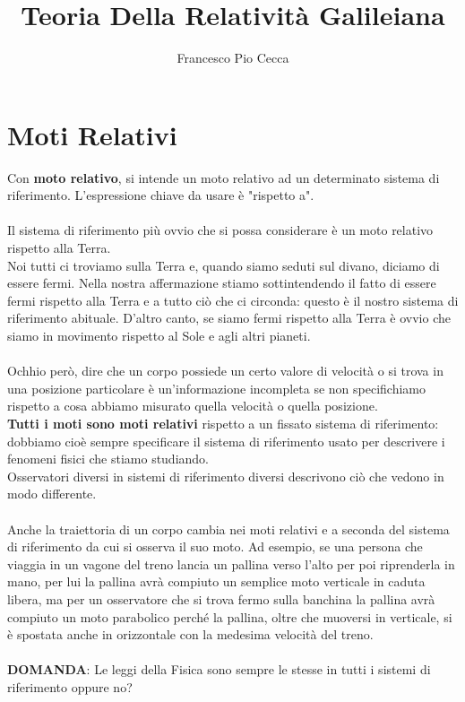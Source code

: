 \documentclass{article}
\title{Teoria Della Relatività Galileiana}
\author{Francesco Pio Cecca}
\begin{document}
\maketitle
\section{Moti Relativi}

Con \textbf{moto relativo}, si intende un moto relativo ad un determinato sistema di riferimento. L'espressione chiave da usare è "rispetto a".\\\\
Il sistema di riferimento più ovvio che si possa considerare è un moto relativo rispetto alla Terra.\\
Noi tutti ci troviamo sulla Terra e, quando siamo seduti sul divano, diciamo di essere fermi. Nella nostra affermazione stiamo sottintendendo il fatto di essere fermi rispetto alla Terra e a tutto ciò che ci circonda: questo è il nostro sistema di riferimento abituale. D'altro canto, se siamo fermi rispetto alla Terra è ovvio che siamo in movimento rispetto al Sole e agli altri pianeti.\\\\
Ochhio però, dire che un corpo possiede un certo valore di velocità o si trova in una posizione particolare è un'informazione incompleta se non specifichiamo rispetto a cosa abbiamo misurato quella velocità o quella posizione.\\
\textbf{Tutti i moti sono moti relativi} rispetto a un fissato sistema di riferimento: dobbiamo cioè sempre specificare il sistema di riferimento usato per descrivere i fenomeni fisici che stiamo studiando.\\
Osservatori diversi in sistemi di riferimento diversi descrivono ciò che vedono in modo differente.\\\\
Anche la traiettoria di un corpo cambia nei moti relativi e a seconda del sistema di riferimento da cui si osserva il suo moto. Ad esempio, se una persona che viaggia in un vagone del treno lancia un pallina verso l'alto per poi riprenderla in mano, per lui la pallina avrà compiuto un semplice moto verticale in caduta libera, ma per un osservatore che si trova fermo sulla banchina la pallina avrà compiuto un moto parabolico perché la pallina, oltre che muoversi in verticale, si è spostata anche in orizzontale con la medesima velocità del treno.\\\\
\textbf{DOMANDA}: Le leggi della Fisica sono sempre le stesse in tutti i sistemi di riferimento oppure no?
\end{document}
